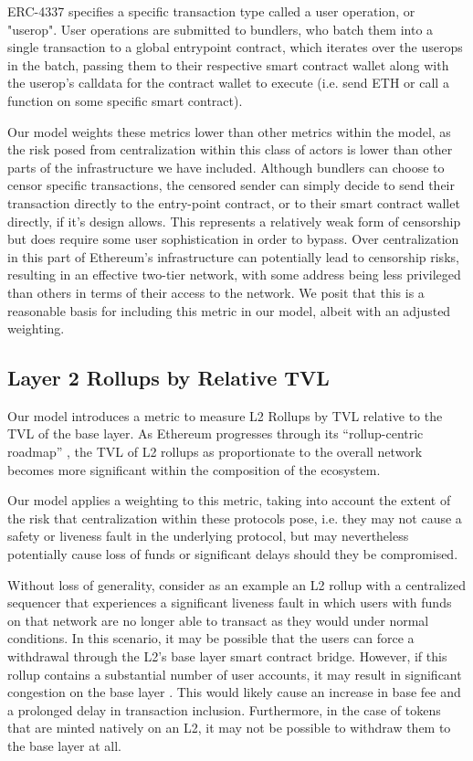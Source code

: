 \documentclass[conference]{IEEEtran}
\begin{document}
ERC-4337 specifies a specific transaction type called a user operation, or "userop".  User operations are submitted to bundlers, who batch them into a single transaction to a global entrypoint contract, which iterates over the userops in the batch, passing them to their respective smart contract wallet along with the userop's calldata for the contract wallet to execute (i.e. send ETH or call a function on some specific smart contract).

Our model weights these metrics lower than other metrics within the model, as the risk posed from centralization within this class of actors is lower than other parts of the infrastructure we have included.  Although bundlers can choose to censor specific transactions, the censored sender can simply decide to send their transaction directly to the entry-point contract, or to their smart contract wallet directly, if it's design allows.  This represents a relatively weak form of censorship but does require some user sophistication in order to bypass. Over centralization in this part of Ethereum's infrastructure can potentially lead to censorship risks, resulting in an effective two-tier network, with some address being less privileged than others in terms of their access to the network. We posit that this is a reasonable basis for including this metric in our model, albeit with an adjusted weighting.

\subsection{Layer 2 Rollups by Relative TVL}

Our model introduces a metric to measure L2 Rollups by TVL relative to the TVL of the base layer.  As Ethereum progresses through its “rollup-centric roadmap” \cite{buterin2020}, the TVL of L2 rollups as proportionate to the overall network becomes more significant within the composition of the ecosystem.

Our model applies a weighting to this metric, taking into account the extent of the risk that centralization within these protocols pose, i.e. they may not cause a safety or liveness fault in the underlying protocol, but may nevertheless potentially cause loss of funds or significant delays should they be compromised.

Without loss of generality, consider as an example an L2 rollup with a centralized sequencer that experiences a significant liveness fault in which users with funds on that network are no longer able to transact as they would under normal conditions.  In this scenario, it may be possible that the users can force a withdrawal through the L2's base layer smart contract bridge.  However, if this rollup contains a substantial number of user accounts, it may result in significant congestion on the base layer \cite{gorzny2022ideal}.  This would likely cause an increase in base fee and a prolonged delay in transaction inclusion.  Furthermore, in the case of tokens that are minted natively on an L2, it may not be possible to withdraw them to the base layer at all.
\end{document}
